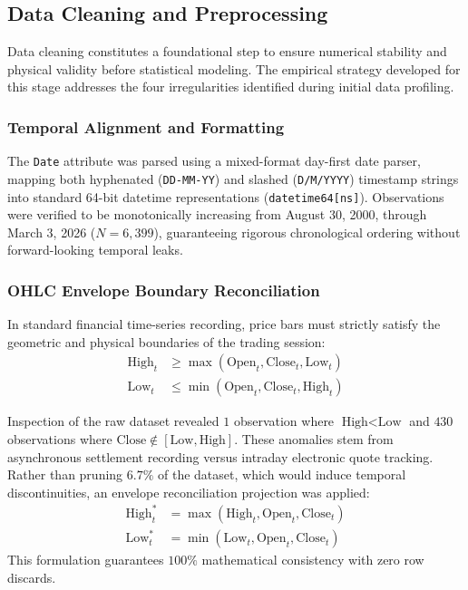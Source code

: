 \documentclass[conference]{IEEEtran}
\begin{document}
\subsection{Data Cleaning and Preprocessing}
\label{sec:data_cleaning}

Data cleaning constitutes a foundational step to ensure numerical stability and physical validity before statistical modeling. The empirical strategy developed for this stage addresses the four irregularities identified during initial data profiling.

\subsubsection{Temporal Alignment and Formatting}
The \texttt{Date} attribute was parsed using a mixed-format day-first date parser, mapping both hyphenated (\texttt{DD-MM-YY}) and slashed (\texttt{D/M/YYYY}) timestamp strings into standard 64-bit datetime representations (\texttt{datetime64[ns]}). Observations were verified to be monotonically increasing from August 30, 2000, through March 3, 2026 ($N = 6{,}399$), guaranteeing rigorous chronological ordering without forward-looking temporal leaks.

\subsubsection{OHLC Envelope Boundary Reconciliation}
In standard financial time-series recording, price bars must strictly satisfy the geometric and physical boundaries of the trading session:
\begin{align}
    \text{High}_t &\ge \max(\text{Open}_t, \text{Close}_t, \text{Low}_t) \\
    \text{Low}_t  &\le \min(\text{Open}_t, \text{Close}_t, \text{High}_t)
\end{align}

Inspection of the raw dataset revealed $1$ observation where $\text{High} < \text{Low}$ and $430$ observations where $\text{Close} \notin [\text{Low}, \text{High}]$. These anomalies stem from asynchronous settlement recording versus intraday electronic quote tracking. Rather than pruning $6.7\%$ of the dataset, which would induce temporal discontinuities, an envelope reconciliation projection was applied:
\begin{align}
    \text{High}^*_t &= \max(\text{High}_t, \text{Open}_t, \text{Close}_t) \\
    \text{Low}^*_t  &= \min(\text{Low}_t, \text{Open}_t, \text{Close}_t)
\end{align}
This formulation guarantees $100\%$ mathematical consistency with zero row discards.
\end{document}
